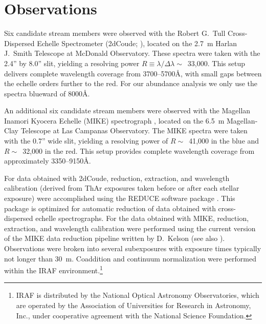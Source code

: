 \documentclass{emulateapj}
\begin{document}
\section{Observations}
\label{obs}


Six candidate stream members were observed with the Robert G.\ Tull
Cross-Dispersed Echelle Spectrometer
(2dCoude; \citealt{tull95}), located on the 2.7~m Harlan J.\ Smith
Telescope at McDonald Observatory.
These spectra were taken with the 2.4'' by 8.0'' slit, yielding 
a resolving power $R \equiv \lambda/\Delta\lambda \sim$~33,000.
This setup delivers complete wavelength coverage from 3700--5700\AA,
with small gaps between the echelle orders further to the red.
For our abundance analysis we only use the spectra blueward of 8000\AA.

An additional six candidate stream members were observed with the 
Magellan Inamori Kyocera Echelle (MIKE)
spectrograph \citep{bernstein03}, located on the 
6.5~m Magellan-Clay Telescope at Las Campanas Observatory.
The MIKE spectra were taken with the 0.7'' wide slit, yielding
a resolving power of $R \sim$~41,000 in the blue 
and $R \sim$~32,000 in the red.
This setup provides complete wavelength coverage from approximately
3350--9150\AA.

For data obtained with 2dCoude,
reduction, extraction, and wavelength calibration 
(derived from ThAr exposures taken before or after each stellar exposure)
were accomplished using the REDUCE software package \citep{piskunov02}.
This package is optimized for automatic reduction of data obtained with 
cross-dispersed echelle spectrographs.
For the data obtained with MIKE, reduction,
extraction, and wavelength calibration were performed using 
the current version of the MIKE data reduction pipeline
written by D.\ Kelson (see also \citealt{kelson03}).
Observations were broken into several subexposures
with exposure times typically not longer than 30~m.
Coaddition and continuum normalization were performed within the 
IRAF environment.\footnote{
IRAF is distributed by the National Optical Astronomy Observatories,
which are operated by the Association of Universities for Research
in Astronomy, Inc., under cooperative agreement with the National
Science Foundation.}
\end{document}

